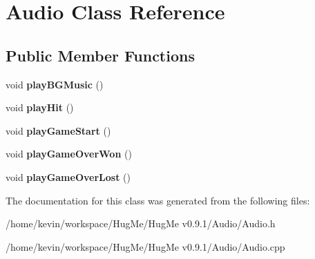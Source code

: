 \hypertarget{classAudio}{
\section{Audio Class Reference}
\label{classAudio}
}
\subsection*{Public Member Functions}
\begin{DoxyCompactItemize}
\item 
\hypertarget{classAudio_abafc657b2fa6b6b622c87ecf7a3acf39}{
void {\bfseries playBGMusic} ()}
\label{classAudio_abafc657b2fa6b6b622c87ecf7a3acf39}

\item 
\hypertarget{classAudio_a5ddf491058537000fed8af79dbf2a35b}{
void {\bfseries playHit} ()}
\label{classAudio_a5ddf491058537000fed8af79dbf2a35b}

\item 
\hypertarget{classAudio_ab645b7ef99ecfecaa3f2df5edd0e6d80}{
void {\bfseries playGameStart} ()}
\label{classAudio_ab645b7ef99ecfecaa3f2df5edd0e6d80}

\item 
\hypertarget{classAudio_a8d71a98c801429602b8d8ab23f494ac9}{
void {\bfseries playGameOverWon} ()}
\label{classAudio_a8d71a98c801429602b8d8ab23f494ac9}

\item 
\hypertarget{classAudio_a832770af29658fc578e81d8e1651088f}{
void {\bfseries playGameOverLost} ()}
\label{classAudio_a832770af29658fc578e81d8e1651088f}

\end{DoxyCompactItemize}


The documentation for this class was generated from the following files:\begin{DoxyCompactItemize}
\item 
/home/kevin/workspace/HugMe/HugMe v0.9.1/Audio/Audio.h\item 
/home/kevin/workspace/HugMe/HugMe v0.9.1/Audio/Audio.cpp\end{DoxyCompactItemize}

